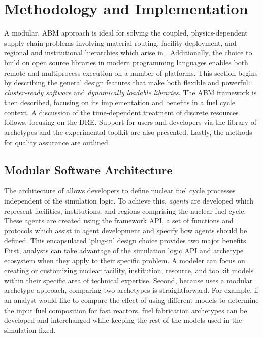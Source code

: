 \section{Methodology and Implementation}

A modular, \acrfull{ABM} approach is ideal for solving the coupled,
physics-dependent supply chain problems involving material routing, facility
deployment, and regional and institutional hierarchies which arise in \Cyclus. Additionally, the choice
to build \Cyclus on open source libraries in modern programming languages
enables both remote and multiprocess execution on a number of platforms. This
section begins by describing the general design features that make \Cyclus both
flexible and powerful: \emph{cluster-ready software} and \emph{dynamically
loadable libraries}.  The
\gls{ABM} framework is then described, focusing on its implementation and benefits
in a fuel cycle context. A discussion of the
time-dependent treatment of discrete resources follows, focusing on the
\gls{DRE}. Support for users and developers via the \Cycamore library of
archetypes and the experimental toolkit are also presented.  Lastly, the methods
for quality assurance are outlined.

\subsection{Modular Software Architecture}

The architecture of \Cyclus allows developers to define nuclear fuel cycle
processes independent of the simulation logic. To achieve this, \emph{agents} are
developed which represent facilities, institutions, and regions comprising the
nuclear fuel cycle. These agents are created using the \Cyclus framework
\gls{API}, a set of functions and protocols which assist in agent development
and specify how agents should be defined.  This encapsulated `plug-in' design
choice provides two major benefits. First, analysts can take advantage of the
simulation logic \gls{API} and archetype ecosystem when they apply \Cyclus to
their specific problem.  A modeler can focus on creating or customizing
nuclear facility, institution, resource, and toolkit models within their
specific area of technical expertise. Second, because \Cyclus uses a modular
archetype approach, comparing two archetypes is straightforward. For example, if
an analyst would like to compare the effect of using different models to
determine the input fuel composition for fast reactors, fuel
fabrication archetypes can be developed and interchanged while keeping the rest
of the models used in the simulation fixed.

